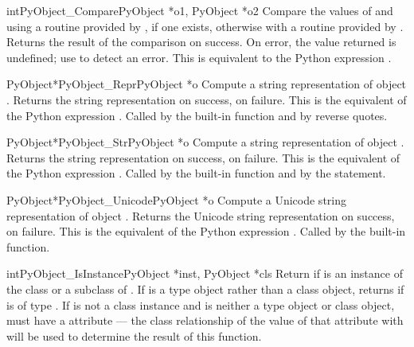 \documentclass{manual}
\begin{document}
\begin{cfuncdesc}{int}{PyObject_Compare}{PyObject *o1, PyObject *o2}
Compare the values of  and  using a routine provided
by , if one exists, otherwise with a routine provided by
.  Returns the result of the comparison on success.  On error,
the value returned is undefined; use  to
detect an error.  This is equivalent to the Python
expression .
\end{cfuncdesc}


\begin{cfuncdesc}{PyObject*}{PyObject_Repr}{PyObject *o}
Compute a string representation of object .  Returns the
string representation on success, \NULL{} on failure.  This is
the equivalent of the Python expression .
Called by the  built-in function
and by reverse quotes.
\end{cfuncdesc}


\begin{cfuncdesc}{PyObject*}{PyObject_Str}{PyObject *o}
Compute a string representation of object .  Returns the
string representation on success, \NULL{} on failure.  This is
the equivalent of the Python expression .
Called by the  built-in function and
by the  statement.
\end{cfuncdesc}


\begin{cfuncdesc}{PyObject*}{PyObject_Unicode}{PyObject *o}
Compute a Unicode string representation of object .  Returns the
Unicode string representation on success, \NULL{} on failure.  This is
the equivalent of the Python expression .
Called by the  built-in function.
\end{cfuncdesc}

\begin{cfuncdesc}{int}{PyObject_IsInstance}{PyObject *inst, PyObject *cls}
Return  if  is an instance of the class  or
a subclass of .  If  is a type object rather than a
class object,  returns  if
 is of type .  If  is not a class
instance and  is neither a type object or class object,
 must have a  attribute --- the class
relationship of the value of that attribute with  will be
used to determine the result of this function.
\end{cfuncdesc}
\end{document}
